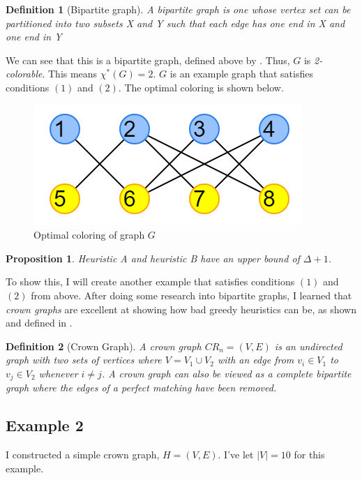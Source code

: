 \documentclass{article}
\newtheorem*{definition}{Definition}
\newtheorem{prop}{Proposition}
\begin{document}
\begin{definition}[Bipartite graph]
A bipartite graph is one whose vertex set can be partitioned into two subsets X and Y such that each edge has one end in X and one end in Y
\end{definition}

We can see that this is a bipartite graph, defined above by \cite{bondymurty}. Thus, \(G\) is \emph{2-colorable}. This means \(\chi^{*}(G) = 2\). \(G\) is an example graph that satisfies conditions \((1)\) and \((2)\). The optimal coloring is shown below.

\begin{figure}[H]
\centering
\includegraphics[scale=0.6]{images/graph-3.png}
\caption{Optimal coloring of graph \(G\)}
\end{figure}


\begin{prop}
Heuristic A and heuristic B have an upper bound of \(\Delta + 1\).
\end{prop}

To show this, I will create another example that satisfies conditions \((1)\) and \((2)\) from above. After doing some research into bipartite graphs, I learned that \emph{crown graphs} are excellent at showing how bad greedy heuristics can be, as shown and defined in \cite{kordecki}.

\begin{definition}[Crown Graph]
A crown graph \(CR_n = (V, E)\) is an undirected graph with two sets of vertices where \(V = V_1 \cup V_2\) with an edge from \(v_i \in V_1\) to \(v_{j} \in V_2\) whenever \(i \neq j\). A crown graph can also be viewed as a complete bipartite graph where the edges of a perfect matching have been removed.
\end{definition}

\subsection*{Example 2}

I constructed a simple crown graph, \(H = (V, E)\). I've let \(|V| = 10\) for this example.
\end{document}
